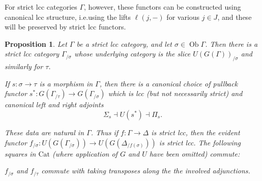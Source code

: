\documentclass[a4paper]{article}
\newtheorem{proposition}[theorem]{Proposition}
\theoremstyle{remark}
\theoremstyle{definition}
\begin{document}
For strict lcc categories $\Gamma$, however, these functors can be constructed using canonical lcc structure, i.e.\@ using the lifts $\ell(j, -)$ for various $j \in J$, and these will be preserved by strict lcc functors.
\begin{proposition}
  \label{prop:strict-slicing}
  Let $\Gamma$ be a strict lcc category, and let $\sigma \in \operatorname{Ob} \Gamma$.
  Then there is a strict lcc category $\Gamma_{/ \sigma}$ whose underlying category is the slice $U(G(\Gamma))_{/ \sigma}$ and similarly for $\tau$.

  If $s : \sigma \rightarrow \tau$ is a morphism in $\Gamma$, then there is a canonical choice of pullback functor $s^* : G(\Gamma_{/ \tau}) \rightarrow G(\Gamma_{/ \sigma})$ which is lcc (but not necessarily strict) and canonical left and right adjoints
  \begin{equation}
    \Sigma_s \dashv U(s^*) \dashv \Pi_s.
  \end{equation}

  These data are natural in $\Gamma$.
  Thus if $f : \Gamma \rightarrow \Delta$ is strict lcc, then the evident functor $f_{/ \sigma} : U(G(\Gamma_{/ \sigma})) \rightarrow U(G(\Delta_{ / f(\sigma)}))$ is strict lcc.
  The following squares in $\mathrm{Cat}$ (where application of $G$ and $U$ have been omitted) commute:
  $f_{/ \sigma}$ and $f_{/ \tau}$ commute with taking transposes along the the involved adjunctions.
\end{proposition}
\end{document}
